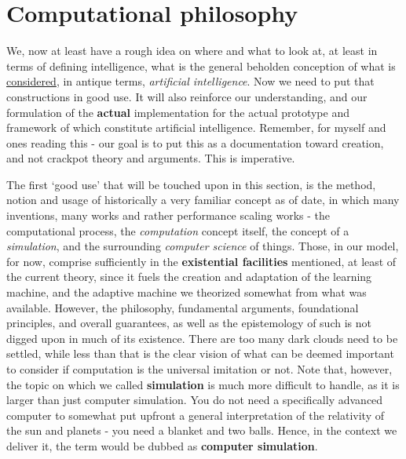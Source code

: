 \chapter{Computational philosophy}

We, now at least have a rough idea on where and what to look at, at least in terms of defining intelligence, what is the general beholden conception of what is \underline{considered}, in antique terms, \textit{artificial intelligence}. Now we need to put that constructions in good use. It will also reinforce our understanding, and our formulation of the \textbf{actual} implementation for the actual prototype and framework of which constitute artificial intelligence. Remember, for myself and ones reading this - our goal is to put this as a documentation toward creation, and not crackpot theory and arguments. This is imperative. 

The first `good use' that will be touched upon in this section, is the method, notion and usage of historically a very familiar concept as of date, in which many inventions, many works and rather performance scaling works - the computational process, the \textit{computation} concept itself, the concept of a \textit{simulation}, and the surrounding \textit{computer science} of things. Those, in our model, for now, comprise sufficiently in the \textbf{existential facilities} mentioned, at least of the current theory, since it fuels the creation and adaptation of the learning machine, and the adaptive machine we theorized somewhat from what was available. However, the philosophy, fundamental arguments, foundational principles, and overall guarantees, as well as the epistemology of such is not digged upon in much of its existence. There are too many dark clouds need to be settled, while less than that is the clear vision of what can be deemed important to consider if computation is the universal imitation or not. Note that, however, the topic on which we called \textbf{simulation} is much more difficult to handle, as it is larger than just computer simulation. You do not need a specifically advanced computer to somewhat put upfront a general interpretation of the relativity of the sun and planets - you need a blanket and two balls. Hence, in the context we deliver it, the term would be dubbed as \textbf{computer simulation}. 

